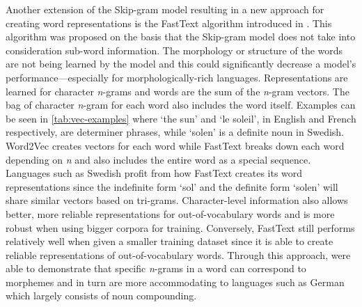 Another extension of the Skip-gram model resulting in a new approach for creating word representations is the FastText algorithm introduced in \citet{bojanowski2017enriching}. This algorithm was proposed on the basis that the Skip-gram model does not take into consideration sub-word information. The morphology or structure of the words are not being learned by the model and this could significantly decrease a model’s performance—especially for morphologically-rich languages. Representations are learned for character \emph{n}-grams and words are the sum of the \emph{n}-gram vectors. The bag of character \emph{n}-gram for each word also includes the word itself. Examples can be seen in \autoref{tab:vec-examples} where `the sun' and `le soleil', in English and French respectively, are determiner phrases,  while `solen' is a definite noun in Swedish. Word2Vec creates vectors for each word while FastText breaks down each word depending on \emph{n} and also includes the entire word as a special sequence. Languages such as Swedish profit from how FastText creates its word representations since the indefinite form `sol' and the definite form `solen' will share similar vectors based on tri-grams. Character-level information also allows better, more reliable representations for out-of-vocabulary words and is more robust when using bigger corpora for training. Conversely, FastText still performs relatively well when given a smaller training dataset since it is able to create reliable representations of out-of-vocabulary words. Through this approach, \citet{bojanowski2017enriching} were able to demonstrate that specific \emph{n}-grams in a word can correspond to morphemes and in turn are more accommodating to languages such as German which largely consists of noun compounding.



